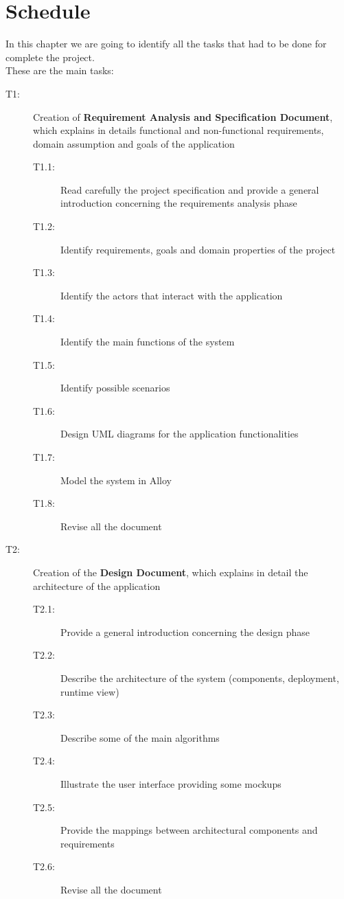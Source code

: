 \pagebreak
\section{Schedule}
In this chapter we are going to identify all the tasks that had to be done for complete the project. \\
These are the main tasks:
\begin{description}
	\item[T1:] Creation of \textbf{Requirement Analysis and Specification Document}, which explains in details functional and non-functional requirements, domain assumption and goals of the application
	\begin{description}
		\item[T1.1:] Read carefully the project specification and provide a general introduction concerning the requirements analysis phase
		\item[T1.2:] Identify requirements, goals and domain properties of the project
		\item[T1.3:] Identify the actors that interact with the application
		\item[T1.4:] Identify the main functions of the system 
		\item[T1.5:] Identify possible scenarios
		\item[T1.6:] Design UML diagrams for the application functionalities
		\item[T1.7:] Model the system in Alloy 
		\item[T1.8:] Revise all the document
	\end{description}

	\item[T2:] Creation of the \textbf{Design Document}, which explains in detail the architecture of the application
	\begin{description}
		\item[T2.1:] Provide a general introduction concerning the design phase
		\item[T2.2:] Describe the architecture of the system (components, deployment, runtime view)
		\item[T2.3:] Describe some of the main algorithms
		\item[T2.4:] Illustrate the user interface providing some mockups
		\item[T2.5:] Provide the mappings between architectural components and requirements
		\item[T2.6:] Revise all the document
	\end{description}


\end{description}
